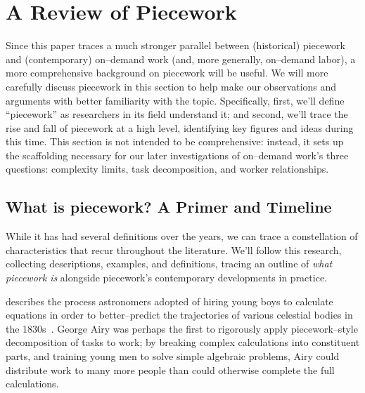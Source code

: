 \documentclass[trackingWork]{subfiles}
\begin{document}
\section{A Review of Piecework}

Since this paper traces a much stronger parallel between
(historical) piecework and (contemporary) on--demand work
(and, more generally, on--demand labor),
a more comprehensive background on piecework will be useful.
We will more carefully discuss piecework in this section
to help make our observations and arguments with better familiarity with the topic.
Specifically,
first, we'll define ``piecework'' as researchers in its field understand it;
and second, we'll trace the rise and fall of piecework at a high level,
identifying key figures and ideas during this time.
This section is not intended to be comprehensive:
instead, it sets up the scaffolding necessary for
our later investigations of on--demand work's three questions:
complexity limits,
task decomposition, and
worker relationships.




\subsection{What is piecework? A Primer and Timeline}\label{sec:whatIsPiecework}

While it has had several definitions over the years,
we can trace a constellation of characteristics that recur throughout the literature.
We'll follow this research, collecting
descriptions,
examples, and
definitions,
tracing an outline of
\textit{what piecework is}
alongside piecework's contemporary developments in practice.

\citeauthor{grier2013computers} describes the process astronomers adopted of hiring young boys
to calculate equations in order
to better--predict the trajectories of various celestial bodies in the 1830s~\cite{grier2013computers}.
George Airy was perhaps the first to rigorously apply piecework--style decomposition of tasks to work;
by breaking complex calculations into constituent parts, and
training young men to solve simple algebraic problems,
Airy could distribute work to many more people than could otherwise complete the full calculations.
\end{document}

